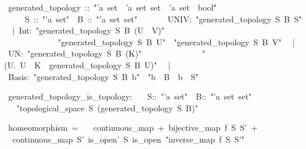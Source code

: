 \documentclass[12pt]{scrartcl}
\begin{document}
\begin{isabelle}
\ generated\_topology\ ::\ "'a\ set\ \isasymRightarrow \ 'a\ set\ set\ \isasymRightarrow \ 'a\ set\ \isasymRightarrow \ bool"\ \isanewline
\ \ \ \ \ S\ ::\ "'a\ set"\ \ B\ ::\ "'a\ set\ set"\isanewline
\ \ \isanewline
\ \ \ \ UNIV:\ "generated\_topology\ S\ B\ S"\isanewline
\ \ |\ Int:\ "generated\_topology\ S\ B\ (U\ \isasyminter \ V)"\ \isanewline
\ \ \ \ \ \ \ \ \ \ \ \ \ "generated\_topology\ S\ B\ U"\ \ "generated\_topology\ S\ B\ V"\isanewline
\ \ |\ UN:\ "generated\_topology\ S\ B\ (\isasymUnion K)"\ \isanewline
\ \ \ \ \ \ \ \ \ \ \ \ \ "(\isasymAnd U.\ U\ \isasymin \ K\ \isasymLongrightarrow \ generated\_topology\ S\ B\ U)"\isanewline
\ \ |\ Basis:\ "generated\_topology\ S\ B\ b"\ \ "b\ \isasymin \ B\ \isasymand \ b\ \isasymsubseteq \ S"
\end{isabelle}
\begin{isabelle}
\ generated\_topology\_is\_topology:\isanewline
\ \ \ S::\ "'a\ set"\ \ B::\ "'a\ set\ set"\isanewline
\ \ \ "topological\_space\ S\ (generated\_topology\ S\ B)"
\end{isabelle}
\begin{isabelle}
\ homeomorphism\ =\ \isanewline
\ \ continuous\_map\ +\ bijective\_map\ f\ S\ S'\ +\ \isanewline
\ \ continuous\_map\ S'\ is\_open'\ S\ is\_open\ "inverse\_map\ f\ S\ S'"
\end{isabelle}
\end{document}
